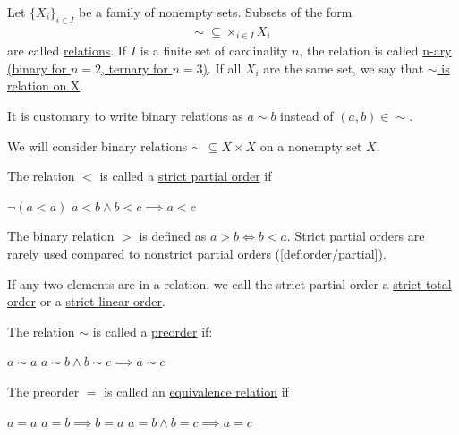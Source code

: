 \begin{definition}\label{def:relations}
  Let $\{ X_i \}_{i \in I}$ be a family of nonempty sets.
  Subsets of the form
  \begin{align*}
    \sim\; \subseteq \times_{i \in I} X_i
  \end{align*}
  are called \uline{relations}. If $I$ is a finite set of cardinality $n$, the relation is called \uline{n-ary (binary for $n = 2$, ternary for $n = 3$)}. If all $X_i$ are the same set, we say that \uline{$\sim$ is relation on X}.

  It is customary to write binary relations as $a \sim b$ instead of $(a, b) \in \sim$.
\end{definition}

\begin{definition}\label{def:orders}
  We will consider binary relations $\sim\; \subseteq X \times X$ on a nonempty set $X$.

  \begin{defenum}
    \item\label{def:order/strict_partial} The relation $<$ is called a \uline{strict partial order} if
    \begin{description}
       $\lnot(a < a)$
       $a < b \land b < c \implies a < c$
    \end{description}

    The binary relation $>$ is defined as $a > b \iff b < a$. Strict partial orders are rarely used compared to nonstrict partial orders (\cref{def:order/partial}).

    If any two elements are in a relation, we call the strict partial order a \uline{strict total order} or a \uline{strict linear order}.

    \item\label{def:order/preorder} The relation $\sim$ is called a \uline{preorder} if:
    \begin{description}
       $a \sim a$
       $a \sim b \land b \sim c \implies a \sim c$
    \end{description}

    \item\label{def:order/equivalence} The preorder $=$ is called an \uline{equivalence relation} if
    \begin{description}
       $a = a$
       $a = b \implies b = a$
       $a = b \land b = c \implies a = c$
    \end{description}


\end{defenum}
\end{definition}
